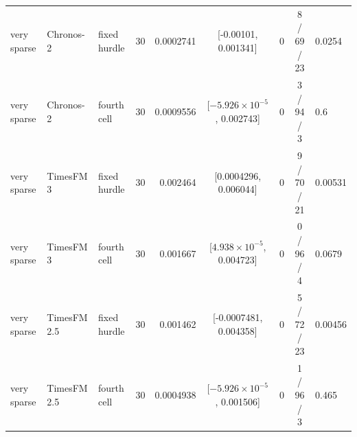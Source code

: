 \begin{table}[htbp]
\begin{tabular}{llllrcrcl}
very sparse & Chronos-2 & fixed hurdle & 30 & 0.0002741 & [-0.00101, 0.001341] & 0 & 8 / 69 / 23 & 0.0254 \\
very sparse & Chronos-2 & fourth cell & 30 & 0.0009556 & [$-5.926 \times 10^{-5}$, 0.002743] & 0 & 3 / 94 / 3 & 0.6 \\
very sparse & TimesFM 3 & fixed hurdle & 30 & 0.002464 & [0.0004296, 0.006044] & 0 & 9 / 70 / 21 & 0.00531 \\
very sparse & TimesFM 3 & fourth cell & 30 & 0.001667 & [$4.938 \times 10^{-5}$, 0.004723] & 0 & 0 / 96 / 4 & 0.0679 \\
very sparse & TimesFM 2.5 & fixed hurdle & 30 & 0.001462 & [-0.0007481, 0.004358] & 0 & 5 / 72 / 23 & 0.00456 \\
very sparse & TimesFM 2.5 & fourth cell & 30 & 0.0004938 & [$-5.926 \times 10^{-5}$, 0.001506] & 0 & 1 / 96 / 3 & 0.465 \\
\bottomrule
\end{tabular}
\end{table}

